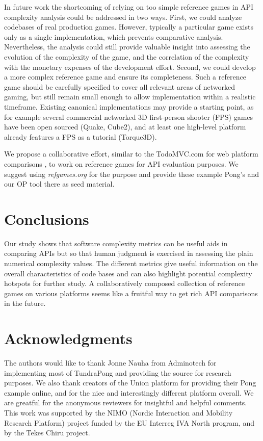 \documentclass[conference]{IEEEtran}
\begin{document}
In future work the shortcoming of relying on too simple reference
games in API complexity analysis could be addressed in two
ways. First, we could analyze codebases of real production
games. However, typically a particular game exists only as a single
implementation, which prevents comparative analysis. Nevertheless, the
analysis could still provide valuable insight into assessing the
evolution of the complexity of the game, and the correlation of the
complexity with the monetary expenses of the development
effort. Second, we could develop a more complex reference game and
ensure its completeness. Such a reference game should be carefully
specified to cover all relevant areas of networked gaming, but still
remain small enough to allow implementation within a realistic
timeframe. Existing canonical implementations may provide a starting
point, as for example several commercial networked 3D first-person
shooter (FPS) games have been open sourced (Quake, Cube2), and at
least one high-level platform already features a FPS as a tutorial
(Torque3D).

We propose a collaborative effort, similar to the TodoMVC.com for web
platform comparisons \cite{todomvc}, to work on reference games for
API evaluation purposes. We suggest using \emph{refgames.org} for the purpose
and provide these example Pong's and our OP tool there as seed material.

\section{Conclusions}

Our study shows that software complexity metrics can be useful aids in
comparing APIs but so that human judgment is exercised in assessing
the plain numerical complexity values. The different metrics give
useful information on the overall characteristics of code bases and
can also highlight potential complexity hotspots for further study. 
A collaboratively composed collection of reference games on various platforms
seems like a fruitful way to get rich API comparisons in the future.

\section*{Acknowledgments}
The authors would like to thank Jonne Nauha from Adminotech for implementing most of TundraPong and providing the source for research purposes.
We also thank creators of the Union platform for providing their Pong example online, and for the nice and interestingly different platform overall.
We are greatful for the anonymous reviewers for insightful and helpful comments.
This work was supported by the NIMO (Nordic Interaction and Mobility Research Platform) project funded by the EU Interreg IVA North program, and by the Tekes Chiru project.



\end{document}
